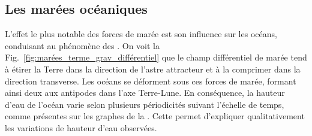 \documentclass[12pt,fancy]{cours}
\begin{document}





\subsection{Les marées océaniques}


L'effet le plus notable des forces de marée est son influence sur les océans, conduisant au phénomène des  . On voit la Fig.~\ref{fig:marées_terme_grav_différentiel} que le champ différentiel de marée tend à étirer la Terre dans la direction de l'astre attracteur et à la comprimer dans la direction transverse. Les océans se déforment sous ces forces de marée, formant ainsi deux  aux antipodes dans l'axe Terre-Lune. En conséquence, la hauteur d'eau de l'océan varie selon plusieurs périodicités suivant l'échelle de temps, comme présentes sur les graphes de la . Cette  permet d'expliquer qualitativement les variations de hauteur d'eau observées.
\end{document}

